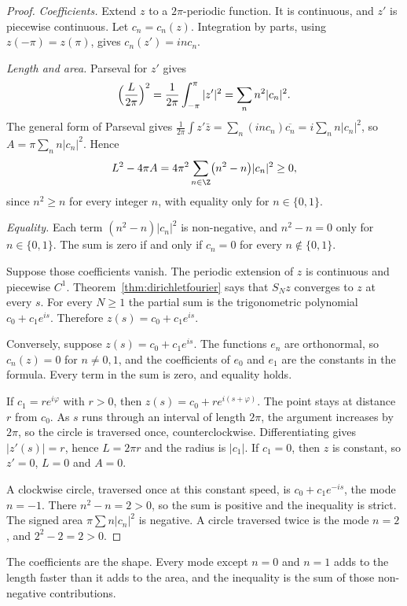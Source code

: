 \begin{proof}
\emph{Coefficients.} Extend $z$ to a $2\pi$-periodic function. It is continuous, and $z'$ is piecewise continuous. Let $c_n=c_n(z)$. Integration by parts, using $z(-\pi)=z(\pi)$, gives $c_n(z')=inc_n$.

\emph{Length and area.} Parseval for $z'$ gives
\[
\Bigl(\frac L{2\pi}\Bigr)^2=\frac1{2\pi}\int_{-\pi}^\pi|z'|^2=\sum_nn^2|c_n|^2.
\]
The general form of Parseval gives $\frac1{2\pi}\int z'\bar z=\sum_n(inc_n)\overline{c_n}=i\sum_nn|c_n|^2$, so $A=\pi\sum_nn|c_n|^2$. Hence
\[
L^2-4\pi A=4\pi^2\sum_{n\in\Z}\bigl(n^2-n\bigr)|c_n|^2\ge0,
\]
since $n^2\ge n$ for every integer $n$, with equality only for $n\in\{0,1\}$.

\emph{Equality.} Each term $(n^2-n)|c_n|^2$ is non-negative, and $n^2-n=0$ only for $n\in\{0,1\}$. The sum is zero if and only if $c_n=0$ for every $n\notin\{0,1\}$.

Suppose those coefficients vanish. The periodic extension of $z$ is continuous and piecewise $C^1$. Theorem~\ref{thm:dirichletfourier} says that $S_Nz$ converges to $z$ at every $s$. For every $N\ge1$ the partial sum is the trigonometric polynomial $c_0+c_1e^{is}$. Therefore $z(s)=c_0+c_1e^{is}$.

Conversely, suppose $z(s)=c_0+c_1e^{is}$. The functions $e_n$ are orthonormal, so $c_n(z)=0$ for $n\ne0,1$, and the coefficients of $e_0$ and $e_1$ are the constants in the formula. Every term in the sum is zero, and equality holds.

If $c_1=re^{i\varphi}$ with $r>0$, then $z(s)=c_0+re^{i(s+\varphi)}$. The point stays at distance $r$ from $c_0$. As $s$ runs through an interval of length $2\pi$, the argument increases by $2\pi$, so the circle is traversed once, counterclockwise. Differentiating gives $|z'(s)|=r$, hence $L=2\pi r$ and the radius is $|c_1|$. If $c_1=0$, then $z$ is constant, so $z'=0$, $L=0$ and $A=0$.

A clockwise circle, traversed once at this constant speed, is $c_0+c_1e^{-is}$, the mode $n=-1$. There $n^2-n=2>0$, so the sum is positive and the inequality is strict. The signed area $\pi\sum n|c_n|^2$ is negative. A circle traversed twice is the mode $n=2$, and $2^2-2=2>0$.
\end{proof}

The coefficients are the shape. Every mode except $n=0$ and $n=1$ adds to the length faster than it adds to the area, and the inequality is the sum of those non-negative contributions.

